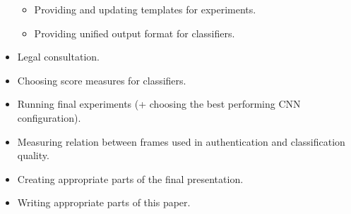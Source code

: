 \begin{itemize}
\begin{itemize}
                \item Providing and updating templates for experiments.
                \item Providing unified output format for classifiers.
            \end{itemize}
            \item Legal consultation.
            \item Choosing score measures for classifiers.
            \item Running final experiments (+ choosing the best performing CNN configuration).
            \item Measuring relation between frames used in authentication and
                  classification quality.
            \item Creating appropriate parts of the final presentation.
            \item Writing appropriate parts of this paper.
        \end{itemize}

